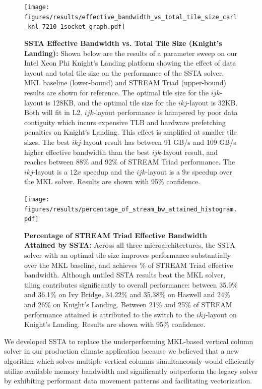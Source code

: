 \documentclass[10pt, conference, compsocconf]{IEEEtran}
\newcommand{\textapprox}{\texttildelow}
\begin{document}
\begin{figure}[!h]
  \centering
  \caption{
    \textbf{SSTA Effective Bandwidth vs. Total Tile Size (Knight's Landing):}
    Shown below are the results of a parameter sweep on our Intel Xeon Phi
      Knight's Landing platform showing the effect of data layout and total
      tile size on the performance of the SSTA solver.
    MKL baseline (lower-bound) and STREAM Triad (upper-bound) results are shown
      for reference.
    The optimal tile size for the \(ijk\)-layout is 128KB, and the optimal
      tile size for the \(ikj\)-layout is 32KB.
    Both will fit in L2.
    \(ijk\)-layout performance is hampered by poor data contiguity which incurs
      expensive TLB and hardware prefetching penalties on Knight's Landing.
    This effect is amplified at smaller tile sizes.
    The best \(ikj\)-layout result has between 91 GB/s and 109 GB/s higher
      effective bandwidth than the best \(ijk\)-layout result, and reaches
      between 88\% and 92\% of STREAM Triad performance.
    The \(ikj\)-layout is a \(12x\) speedup and the \(ijk\)-layout is a
      \(9x\) speedup over the MKL solver.
    Results are shown with 95\% confidence.
  }
  \label{fig:results:bw_vs_tile_size_knl}
  \texttt{[image: figures/results/effective\_bandwidth\_vs\_total\_tile\_size\_carl\_knl\_7210\_1socket\_graph.pdf]}
\end{figure}

\begin{figure}[!h]
  \centering
  \caption{
    \textbf{Percentage of STREAM Triad Effective Bandwidth Attained by SSTA:}
    Across all three microarchitectures, the SSTA solver with an optimal tile
      size improves performance substantially over the MKL baseline, and
      achieves \textapprox 90\% of STREAM Triad effective bandwidth.
    Although untiled SSTA results beat the MKL solver, tiling contributes
      significantly to overall performance: between 35.9\% and 36.1\% on 
      Ivy Bridge, 34.22\% and 35.38\% on Haswell and 24\% and 26\% on 
      Knight's Landing.
    Between 21\% and 25\% of STREAM performance attained is attributed to the
      switch to the \(ikj\)-layout on Knight's Landing. 
    Results are shown with 95\% confidence.
  }
  \label{fig:results:percent_stream_bw}
  \texttt{[image: figures/results/percentage\_of\_stream\_bw\_attained\_histogram.pdf]}
\end{figure}

We developed SSTA to replace the underperforming MKL-based vertical column
  solver in our production climate application because we believed that a new
  algorithm which solves multiple vertical columns simultaneously would
  efficiently utilize available memory bandwidth and significantly outperform the
  legacy solver by exhibiting performant data movement patterns and facilitating
  vectorization.
\end{document}
